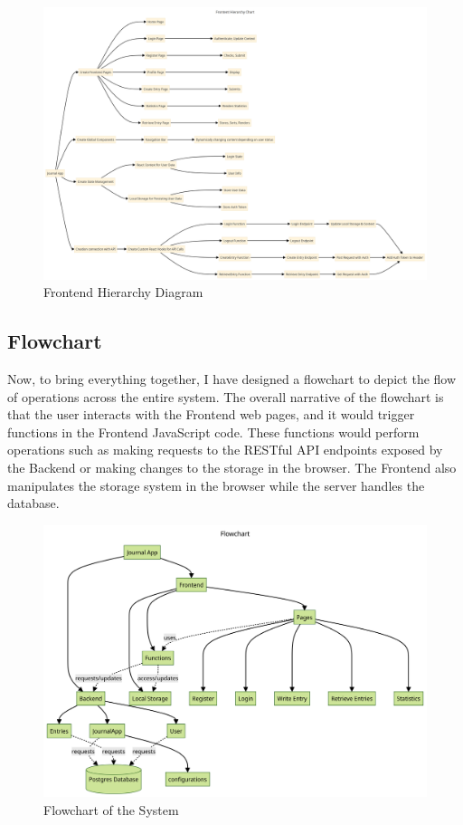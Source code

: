 \begin{landscape}
    \begin{figure}
        \centering
        \includegraphics[width=1\linewidth]{Assets/FrontendER.png}
        \caption{Frontend Hierarchy Diagram}
        \label{fig:FrontendHD}
    \end{figure}
\end{landscape}

\subsection{Flowchart}
Now, to bring everything together, I have designed a flowchart to depict the flow of operations across the entire system. The overall narrative of the flowchart is that the user interacts with the Frontend web pages, and it would trigger functions in the Frontend JavaScript code. These functions would perform operations such as making requests to the RESTful API endpoints exposed by the Backend or making changes to the storage in the browser. The Frontend also manipulates the storage system in the browser while the server handles the database. 

\begin{figure}[h]
    \centering
    \includegraphics[width=5in]{Assets/Flowchart.png}
    \caption{Flowchart of the System}
    \label{fig:3.3}
\end{figure}

